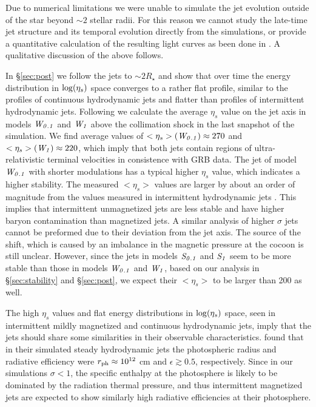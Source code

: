 \documentclass[fleqn,usenatbib]{mnras}
\newcommand{\Wa}{{\it W_{0.1}}}
\newcommand{\Wb}{{\it W_{1}}}
\newcommand{\Sa}{{\it S_{0.1}}}
\newcommand{\Sb}{{\it S_{1}}}
\begin{document}
    Due to numerical limitations we were unable to simulate the jet evolution outside of the star beyond $\sim 2$ stellar radii. For this reason we cannot study the late-time jet structure and its temporal evolution directly from the simulations, or provide a quantitative calculation of the resulting light curves as been done in \citet{Gottlieb2019,Gottlieb2020a}. A qualitative discussion of the above follows.

	In \S\ref{sec:post} we follow the jets to $ \sim 2R_\star $ and show that over time the energy distribution in $ {\rm log}(\eta_s) $ space converges to a rather flat profile, similar to the profiles of continuous hydrodynamic jets and flatter than profiles of intermittent hydrodynamic jets.
	Following \citet{Gottlieb2019} we calculate the average $ \eta_s $ value on the jet axis in models $ \Wa $ and $ \Wb $ above the collimation shock in the last snapshot of the simulation. 
	We find average values of $<\eta_s>(\Wa) \approx 270 $ and  $<\eta_s>(\Wb) \approx 220 $, which imply that both jets contain regions of ultra-relativistic terminal velocities in consistence with GRB data. The jet of model $\Wa$ with shorter modulations  has a typical higher $ \eta_s $ value, which indicates a higher stability.
	The measured $<\eta_s>$ values are larger by about an order of magnitude from the values measured in intermittent hydrodynamic jets \citep{Gottlieb2020b}. This implies that intermittent unmagnetized jets are less stable and have higher baryon contamination than magnetized jets.
    A similar analysis of higher $ \sigma $ jets cannot be preformed due to their deviation from the jet axis. The source of the shift, which is caused by an imbalance in the magnetic pressure at the cocoon is still unclear. However, since the jets in models $ \Sa $ and $ \Sb $ seem to be more stable than those in models $ \Wa $ and $ \Wb $, based on our analysis in \S\ref{sec:stability} and \S\ref{sec:post}, 
    we expect their $ <\eta_s>$ to be larger than 200 as well.
    
    The high $ \eta_s$ values and flat energy distributions in ${\rm log}(\eta_s)$ space, seen in intermittent mildly magnetized and continuous hydrodynamic jets, imply that the jets should share some similarities in their observable characteristics. \citet{Gottlieb2019} found that in their simulated steady hydrodynamic jets the photospheric radius and radiative efficiency were $ r_{\rm ph} \approx 10^{12} $ cm and $ \epsilon \gtrsim 0.5 $, respectively.
	Since in our simulations $ \sigma < 1 $, the specific enthalpy at the photosphere is likely to be dominated by the radiation thermal pressure, and thus intermittent magnetized jets are expected to show similarly high radiative efficiencies at their photosphere.
	
\end{document}
